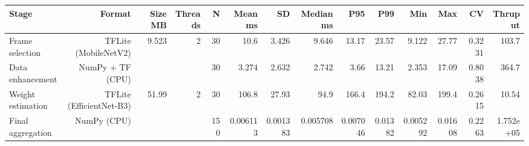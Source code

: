 \begin{tabular}{lrrrrrrrrrrrrr}
\toprule
Stage & Format & Size MB & Threads & N & Mean ms & SD & Median ms & P95 & P99 & Min & Max & CV & Thruput \\
\midrule
Frame selection & TFLite (MobileNetV2) & 9.523 & 2 & 30 & 10.6 & 3.426 & 9.646 & 13.17 & 23.57 & 9.122 & 27.77 & 0.3231 & 103.7 \\
Data enhancement & NumPy + TF (CPU) &  &  & 30 & 3.274 & 2.632 & 2.742 & 3.66 & 13.21 & 2.353 & 17.09 & 0.8038 & 364.7 \\
Weight estimation & TFLite (EfficientNet-B3) & 51.99 & 2 & 30 & 106.8 & 27.93 & 94.9 & 166.4 & 194.2 & 82.03 & 199.4 & 0.2615 & 10.54 \\
Final aggregation & NumPy (CPU) &  &  & 150 & 0.006113 & 0.001383 & 0.005708 & 0.007046 & 0.01382 & 0.005292 & 0.01608 & 0.2263 & 1.752e+05 \\
\bottomrule
\end{tabular}
